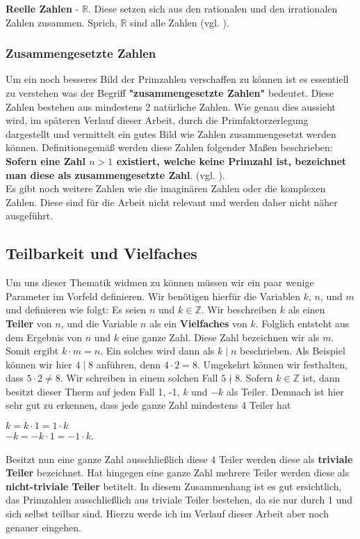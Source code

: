 \documentclass[german,12pt,a4paper]{article}
\begin{document}
\textbf{Reelle Zahlen} - $\mathbb{R}$. Diese setzen sich aus den rationalen und den irrationalen Zahlen zusammen. Sprich, $\mathbb{R}$ sind alle Zahlen (vgl. \cite[7--9]{Engel2017}).

\subsubsection{Zusammengesetzte Zahlen}
Um ein noch besseres Bild der Primzahlen verschaffen zu können ist es essentiell zu verstehen was der Begriff \textbf{"{zusammengesetzte Zahlen}"} bedeutet. Diese Zahlen bestehen aus mindestens 2 natürliche Zahlen. Wie genau dies aussieht wird, im späteren Verlauf dieser Arbeit, durch die Primfaktorzerlegung dargestellt und vermittelt ein gutes Bild wie Zahlen zusammengesetzt werden können. Definitionsgemäß werden diese Zahlen folgender Maßen beschrieben:\\
\hspace*{10mm}\textbf{Sofern eine Zahl $n > 1$ existiert, welche keine Primzahl ist, bezeichnet man diese als zusammengesetzte Zahl}. (vgl. \cite[13]{RempeGillen2009}).\\

Es gibt noch weitere Zahlen wie die imaginären Zahlen oder die komplexen Zahlen. Diese sind für die Arbeit nicht relevant und werden daher nicht näher ausgeführt.

\subsection{Teilbarkeit und Vielfaches}
Um uns dieser Thematik widmen zu können müssen wir ein paar wenige Parameter im Vorfeld definieren.\newline
Wir benötigen hierfür die Variablen $k$, $n$, und $m$ und definieren wie folgt:\newline
Es seien $n$ und $k \in \mathbb{Z}$. Wir beschreiben $k$ als einen \textbf{Teiler} von $n$, und die Variable $n$ als ein \textbf{Vielfaches} von $k$. Folglich entsteht aus dem Ergebnis von $n$ und $k$ eine ganze Zahl. Diese Zahl bezeichnen wir als $m$. Somit ergibt $k\cdot{m} = n$. Ein solches wird dann als $k \mid n$ beschrieben.\newline
Als Beispiel können wir hier $4 \mid 8$ anführen, denn $4 \cdot 2 = 8$. Umgekehrt können wir festhalten, dass $5 \cdot 2 \neq 8$. Wir schreiben in einem solchen Fall $5 \nmid 8$.\newline
Sofern $k \in \mathbb{Z}$ ist, dann besitzt dieser Therm auf jeden Fall 1, -1, $k$ und $-k$ als Teiler. Demnach ist hier sehr gut zu erkennen, dass jede ganze Zahl mindestens 4 Teiler hat
\begin{center}
$k = k \cdot 1 = 1 \cdot k$\\
$-k = -k \cdot 1 = -1 \cdot k$.
\end{center}
Besitzt nun eine ganze Zahl ausschließlich diese 4 Teiler werden diese als \textbf{triviale Teiler} bezeichnet. Hat hingegen eine ganze Zahl mehrere Teiler werden diese als \textbf{nicht-triviale Teiler} betitelt. In diesem Zusammenhang ist es gut ersichtlich, das Primzahlen ausschließlich aus triviale Teiler bestehen, da sie nur durch 1 und sich selbst teilbar sind. Hierzu werde ich im Verlauf dieser Arbeit aber noch genauer eingehen.
\end{document}
